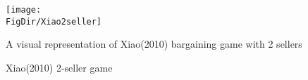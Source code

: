 \begin{figure}[ht]
	\centerline{
		\texttt{[image: \\FigDir/Xiao2seller]}
	}
	\caption{Xiao(2010) 2-seller game} \label{fig:Xiao2seller}
	\footnotesize{A visual representation of Xiao(2010) bargaining game with 2 sellers}
\end{figure}